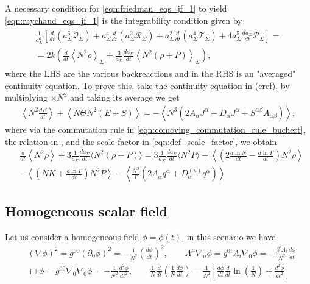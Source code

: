 A necessary condition for \cref{eqn:friedman_eqs_jf_1} to yield \cref{eqn:raychaud_eqs_jf_1} is the integrability condition given by \cite{Buchert_2020}
\begin{align}
\begin{gathered}
\frac{1}{a_\Sigma^6}\left[\frac{d}{d t}\left(a_\Sigma^6\mathcal{Q}_{\Sigma}\right)+a_\Sigma^4\frac{d}{dt}\left(a_\Sigma^2\mathcal{R}_{\Sigma}\right)+a_\Sigma^2\frac{d}{dt}\left(a_\Sigma^4 \mathcal{T}_{\Sigma}\right)+4a_\Sigma^5\frac{da_\Sigma}{dt}\mathcal{P}_{\Sigma}\right]=\nonumber \\
=2k\left(\frac{d}{d t}\left\langle N^2 \rho\right\rangle_{\Sigma}+\frac{3}{a_{\Sigma}} \frac{d a_{\Sigma}}{d t}\left\langle N^2(\rho+P)\right\rangle_{\Sigma}\right),
\end{gathered}
\end{align}
where the LHS are the various backreactions and in the RHS is an "averaged" continuity equation. To prove this, take the continuity equation in (cref), by multiplying $\times N^3$ and taking its average we get
\begin{align}
    \left\langle N^2\frac{d E}{dt}\right\rangle + \left\langle N\Theta N^2(E+S)\right\rangle =  -\left\langle N^3\left( 2 A_\alpha J^\alpha +  D_\alpha J^\alpha+ S^{\alpha\beta}A_{\alpha\beta}\right)\right\rangle,
\end{align}
where via the commutation rule in \cref{eqn:comoving_commutation_rule_buchert}, the relation in , and the scale factor in \cref{eqn:def_scale_factor}, we obtain
\begin{align}
    &\frac{d}{dt}\left\langle N^2\rho\right\rangle+3\frac{1}{a_\Sigma}\frac{da_\Sigma}{dt}\langle N^2(\rho+P)\rangle=3\frac{1}{a_\Sigma}\frac{da_\Sigma}{dt}\langle N^2P\rangle+\left\langle \left(2\frac{d\ln N}{dt}-\frac{d\ln \Gamma}{dt}\right)N^2\rho\right\rangle\\
    &-\left\langle\left(NK+\frac{d\ln\Gamma}{dt}\right)N^2P\right\rangle-\left\langle \frac{N^3}{\Gamma}\left(2A_\alpha q^\alpha+D^{(u)}_\alpha q^\alpha\right)\right\rangle
\end{align}




\subsection{Homogeneous scalar field}

Let us consider a homogeneous field $\phi=\phi(t)$, in this scenario we have
\begin{align}
    &(\nabla\phi)^2=g^{00}(\partial_0\phi)^2=-\frac{1}{N^2}\left(\frac{d\phi}{dt}\right)^2, \qquad A^\mu\nabla_\mu\phi=g^{0i}A_i\nabla_0\phi=-\frac{\beta^i A_i}{N^2}\frac{d\phi}{dt}\\
    &\Box\phi=g^{00}\nabla_0\nabla_0\phi=-\frac{1}{N^2}\frac{d^2\phi}{dt^2},\qquad \frac{1}{N}\frac{d}{dt}\left(\frac{1}{N}\frac{d\phi}{dt}\right)=\frac{1}{N^2}\left[\frac{d\phi}{dt}\frac{d}{dt}\ln\left(\frac{1}{N}\right)+\frac{d^2\phi}{dt^2}\right]
\end{align}










